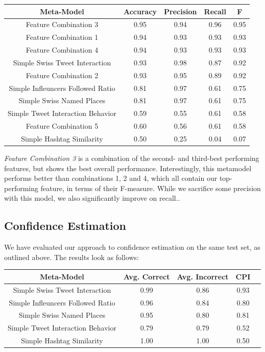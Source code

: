 \documentclass[10pt,a4paper]{article}
\begin{document}
\begin{center}
\begin{tabular}{ |c|c|c|c|c| }
\hline
\textbf{Meta-Model} & \textbf{Accuracy} & \textbf{Precision} & \textbf{Recall} & \textbf{F} \\
\hline
Feature Combination 3 & 0.95 & 0.94 & 0.96 & 0.95 \\
\hline
Feature Combination 1 & 0.94 & 0.93 & 0.93 & 0.93 \\
\hline
Feature Combination 4 & 0.94 & 0.93 & 0.93 & 0.93 \\
\hline
Simple Swiss Tweet Interaction & 0.93 & 0.98 & 0.87 & 0.92 \\
\hline
Feature Combination 2 & 0.93 & 0.95 & 0.89 & 0.92 \\
\hline
Simple Infleuncers Followed Ratio & 0.81 & 0.97 & 0.61 & 0.75 \\
\hline
Simple Swiss Named Places & 0.81 & 0.97 & 0.61 & 0.75 \\
\hline
Simple Tweet Interaction Behavior & 0.59 & 0.55 & 0.61 & 0.58 \\
\hline
Feature Combination 5 & 0.60 & 0.56 & 0.61 & 0.58 \\
\hline
Simple Hashtag Similarity & 0.50 & 0.25 & 0.04 & 0.07 \\
\hline
\end{tabular}
\end{center}

\textit{Feature Combination 3} is a combination of the second- and third-best performing features, but shows the best overall performance. Interestingly, this metamodel performs better than combinations 1, 2 and 4, which all contain our top-performing feature, in terms of their F-measure. While we sacrifice some precision with this model, we also significantly improve on recall..

\subsection{Confidence Estimation}
We have evaluated our approach to confidence estimation on the same test set, as outlined above. The results look as follows:

\begin{center}
\begin{tabular}{ |c|c|c|c|c| }
\hline
\textbf{Meta-Model} & \textbf{Avg. Correct} & \textbf{Avg. Incorrect} & \textbf{CPI} \\
\hline
Simple Swiss Tweet Interaction & 0.99 & 0.86 & 0.93 \\
\hline
Simple Infleuncers Followed Ratio & 0.96 & 0.84 & 0.80 \\
\hline
Simple Swiss Named Places & 0.95 & 0.80 & 0.81 \\
\hline
\hline
Simple Tweet Interaction Behavior & 0.79 & 0.79 & 0.52 \\
\hline
Simple Hashtag Similarity & 1.00 & 1.00 & 0.50 \\
\hline
\end{tabular}
\end{center}
\end{document}

